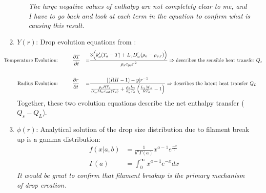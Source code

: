 \documentclass[10pt,a4paper]{article}
\begin{document}
\begin{enumerate}
\begin{enumerate}
\begin{center}
\textit{The large negative values of enthalpy are not completely clear to me, and I have to go back and look at each term in the equation to confirm what is causing this result.}
\end{center}
\end{enumerate}
\item $Y(r)$: Drop evolution equations from \citet{Pruppacher1978}:
\begin{align*}
\hspace*{-1in}\text{Temperature Evolution:}&\hspace*{1cm}\frac{\partial T}{\partial t} &=& \frac{3\Big(k_a'(T_a-T)+L_vD_w'(\rho_v-\rho_{v,r})\Big)}{\rho_sc_{ps}r^2} \Rightarrow \text{describes the sensible heat transfer } Q_s\\
\vspace*{0.25cm}\\
\text{Radius Evolution:}&\hspace*{1cm}\frac{\partial r}{\partial t} &=& \frac{[(RH-1)-y]r^{-1}}{\frac{\rho_sRT_a}{D_w'M_we_{\text{sat}}(T_a)}+\frac{\rho_sL_v}{k_a'T_a}\left(\frac{L_vM_w}{RT_a}-1\right)}\Rightarrow \text{describes the latent heat transfer } Q_L
\end{align*}
Together, these two evolution equations describe the net enthalpy transfer ($Q_s-Q_L$).
\item $\phi(r)$: Analytical solution of the drop size distribution due to filament break up is a gamma distribution:
\begin{align*}
f(x|a,b) &= \frac{1}{b^a\Gamma(a)}x^{a-1}e^{\frac{-x}{b}}\\
\Gamma(a) &= \int_0^\infty x^{a-1}e^{-x}dx
\end{align*}
\textit{It would be great to confirm that filament breakup is the primary mechanism of drop creation.}
\end{enumerate}
\end{document}
